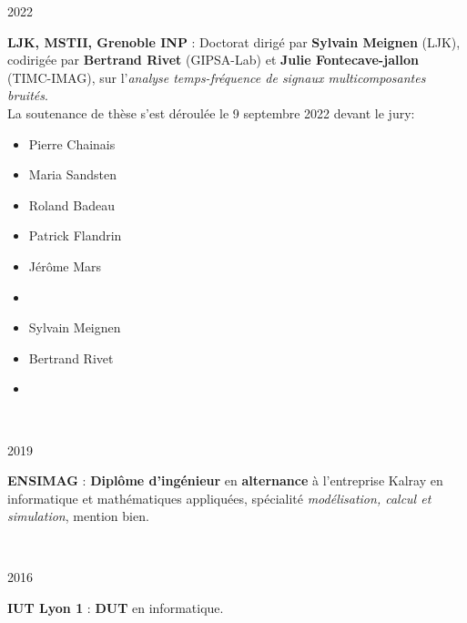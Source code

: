 \documentclass[a4paper,10pt, french]{article}
\begin{document}
\noindent
\begin{minipage}{0.20\textwidth}
  \color{MyGray} 2022
\end{minipage}
\hfill
\begin{minipage}{0.70\textwidth}
  \textbf{LJK, MSTII, Grenoble INP} :  Doctorat dirigé par \textbf{Sylvain Meignen} (LJK), codirigée par \textbf{Bertrand Rivet} (GIPSA-Lab) et \textbf{Julie Fontecave-jallon} (TIMC-IMAG), sur l'\emph{analyse temps-fréquence de signaux multicomposantes bruités}.\\
  La soutenance de thèse s'est déroulée le 9 septembre 2022 devant le jury:
  \begin{multicols}{3}
  	\begin{itemize}
  		\item[] Pierre Chainais
  		\item[] Maria Sandsten
  		\item[] Roland Badeau
  	\end{itemize}
  	\columnbreak
  	\begin{itemize}
  		\item[] Patrick Flandrin
  		\item[] Jérôme Mars
  		\item[] 
  	\end{itemize}
  	\columnbreak
  	\begin{itemize}
  		\item[] Sylvain Meignen
  		\item[] Bertrand Rivet
  		\item[] 
  	\end{itemize}
  \end{multicols}
\end{minipage}\\
\vspace{2mm}

\noindent
\begin{minipage}{0.20\textwidth}
  \color{MyGray} 2019
\end{minipage}
\hfill
\begin{minipage}{0.70\textwidth}
  \textbf{ENSIMAG} : \textbf{Diplôme d'ingénieur} en \textbf{alternance} à l'entreprise Kalray en informatique et mathématiques appliquées, spécialité \emph{modélisation, calcul et simulation}, mention bien.%
\end{minipage}\\
\vspace{2mm}

\noindent
\begin{minipage}{0.20\textwidth}
  \color{MyGray} 2016
\end{minipage}
\hfill
\begin{minipage}{0.70\textwidth}
  \textbf{IUT Lyon 1} : \textbf{DUT} en informatique.
\end{minipage}\\
\vspace{2mm}
\end{document}
